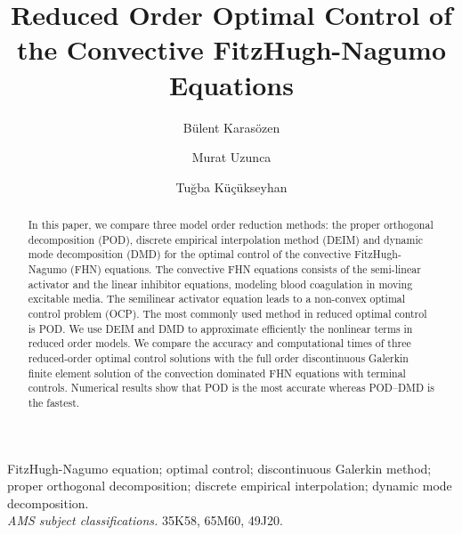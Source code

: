 \documentclass[preprint,12pt]{elsarticle}
\begin{document}
\begin{frontmatter}

\title{Reduced Order Optimal Control of the Convective FitzHugh-Nagumo Equations}

\author[iam]{B\"ulent Karas\"{o}zen }

\author[sin]{Murat Uzunca}

\author[bal]{Tu\u{g}ba K\"u\c{c}\"ukseyhan }



\address[iam]{Institute of Applied Mathematics \& Department of Mathematics, Middle East Technical University, 06800 Ankara, Turkey}
\address[sin]{Department of Mathematics, Sinop University, 57000 Sinop, Turkey}
\address[bal]{Department of Mathematics, Bal{\i}kesir  University,  10145 Bal{\i}kesir,  Turkey}


\begin{abstract}
In this paper, we compare three model order reduction methods: the proper orthogonal decomposition (POD), discrete empirical interpolation method (DEIM) and dynamic mode decomposition (DMD) for the optimal control of the convective  FitzHugh-Nagumo (FHN) equations. The convective  FHN equations consists of the semi-linear activator and the linear inhibitor equations, modeling blood coagulation in moving excitable media. The semilinear activator equation leads to a non-convex optimal control problem (OCP).  The most commonly used method in reduced optimal control is POD. We use DEIM and DMD  to approximate efficiently the nonlinear terms in reduced order models. We compare the accuracy and computational times of three reduced-order optimal control solutions with the full order discontinuous Galerkin finite element solution of the convection dominated FHN equations with terminal controls.  Numerical results show that POD is the most accurate whereas POD--DMD is the fastest.
\end{abstract}

\begin{keyword}
FitzHugh-Nagumo equation; optimal control; discontinuous Galerkin method; proper orthogonal decomposition; discrete empirical interpolation; dynamic mode decomposition.\\
{\em AMS subject classifications.\/} 35K58, 65M60, 49J20.
\end{keyword}

\end{frontmatter}
\end{document}
